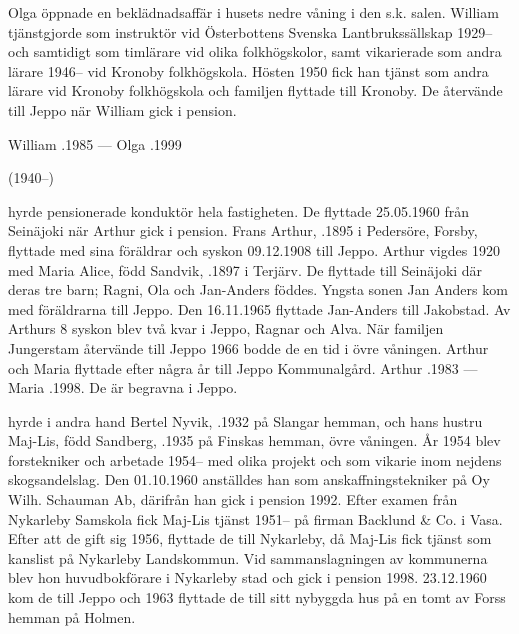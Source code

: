 
Olga öppnade en beklädnadsaffär i husets nedre våning i den s.k. salen.	William tjänstgjorde som instruktör vid Österbottens Svenska 	Lantbrukssällskap 1929-- och samtidigt som timlärare vid olika folkhögskolor, samt vikarierade som andra lärare 1946-- vid Kronoby folkhögskola. Hösten 1950 fick han tjänst som andra lärare vid Kronoby folkhögskola och familjen flyttade till Kronoby. De återvände till Jeppo när William gick i pension.

William .1985 	---  Olga .1999


 (1940--)

 hyrde pensionerade konduktör  hela fastigheten. De flyttade 25.05.1960 från Seinäjoki när Arthur gick i pension. Frans Arthur, .1895 i Pedersöre, Forsby, flyttade med sina föräldrar och syskon 09.12.1908 till Jeppo. Arthur vigdes 1920 med Maria Alice, född Sandvik, .1897 i Terjärv. De flyttade till Seinäjoki där deras tre barn; Ragni, Ola och Jan-Anders föddes. Yngsta sonen Jan Anders kom med föräldrarna till Jeppo. Den 16.11.1965 flyttade Jan-Anders till Jakobstad. Av Arthurs 8 syskon blev två kvar i Jeppo, Ragnar och Alva. När familjen Jungerstam återvände till Jeppo 1966 bodde de en tid i övre våningen. Arthur och Maria flyttade efter några år till Jeppo Kommunalgård.
Arthur .1983  ---  Maria .1998. De är begravna i Jeppo.

 hyrde i andra hand Bertel Nyvik, .1932 på Slangar hemman, och hans hustru Maj-Lis, född Sandberg, .1935 på Finskas hemman, övre våningen. År 1954 blev  forstekniker och arbetade 1954-- med olika projekt och som vikarie inom nejdens skogsandelslag. Den 01.10.1960 anställdes han som anskaffningstekniker på Oy Wilh. Schauman Ab, därifrån han gick i pension 1992. Efter examen från Nykarleby Samskola fick Maj-Lis tjänst 1951-- på firman Backlund \& Co. i Vasa. Efter att de gift sig 1956, flyttade de till Nykarleby, då Maj-Lis fick tjänst som kanslist på Nykarleby Landskommun. Vid sammanslagningen av kommunerna blev hon huvudbokförare i Nykarleby stad och gick i pension 1998. 23.12.1960 kom de till Jeppo och 1963 flyttade de till sitt nybyggda hus på en tomt av Forss hemman på Holmen.

